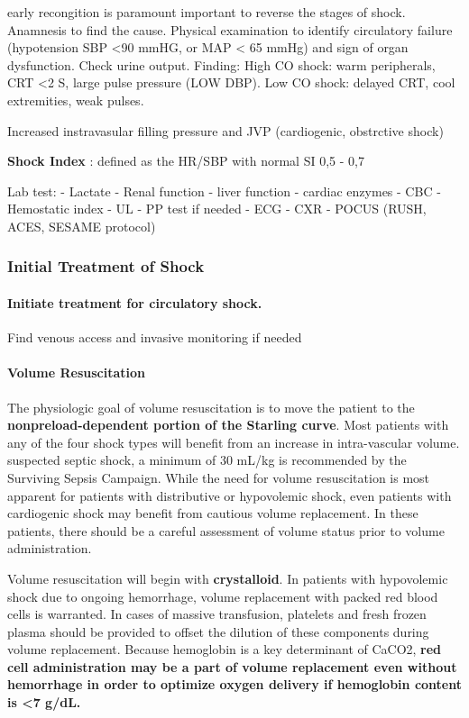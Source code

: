 \documentclass[
  letterpaper,
  DIV=11,
  numbers=noendperiod]{scrreprt}
\let\oldparagraph\paragraph
\renewcommand{\paragraph}[1]{\oldparagraph{#1}\mbox{}}
\begin{document}
early recongition is paramount important to reverse the stages of shock.
Anamnesis to find the cause. Physical examination to identify
circulatory failure (hypotension SBP \textless90 mmHG, or MAP
\textless{} 65 mmHg) and sign of organ dysfunction. Check urine output.
Finding: High CO shock: warm peripherals, CRT \textless2 S, large pulse
pressure (LOW DBP). Low CO shock: delayed CRT, cool extremities, weak
pulses.

Increased instravasular filling pressure and JVP (cardiogenic,
obstrctive shock)

\textbf{Shock Index} : defined as the HR/SBP with normal SI 0,5 - 0,7

Lab test: - Lactate - Renal function - liver function - cardiac enzymes
- CBC - Hemostatic index - UL - PP test if needed - ECG - CXR - POCUS
(RUSH, ACES, SESAME protocol)

\subsubsection{Initial Treatment of
Shock}\label{initial-treatment-of-shock}

\paragraph{Initiate treatment for circulatory
shock.}\label{initiate-treatment-for-circulatory-shock.}

Find venous access and invasive monitoring if needed

\paragraph{Volume Resuscitation}\label{volume-resuscitation}

The physiologic goal of volume resuscitation is to move the patient to
the \textbf{nonpreload-dependent portion of the Starling curve}. Most
patients with any of the four shock types will benefit from an increase
in intra-vascular volume. suspected septic shock, a minimum of 30 mL/kg
is recommended by the Surviving Sepsis Campaign. While the need for
volume resuscitation is most apparent for patients with distributive or
hypovolemic shock, even patients with cardiogenic shock may benefit from
cautious volume replacement. In these patients, there should be a
careful assessment of volume status prior to volume administration.

Volume resuscitation will begin with \textbf{crystalloid}. In patients
with hypovolemic shock due to ongoing hemorrhage, volume replacement
with packed red blood cells is warranted. In cases of massive
transfusion, platelets and fresh frozen plasma should be provided to
offset the dilution of these components during volume replacement.
Because hemoglobin is a key determinant of CaCO2, \textbf{red cell
administration may be a part of volume replacement even without
hemorrhage in order to optimize oxygen delivery if hemoglobin content is
\textless7 g/dL.}
\end{document}
